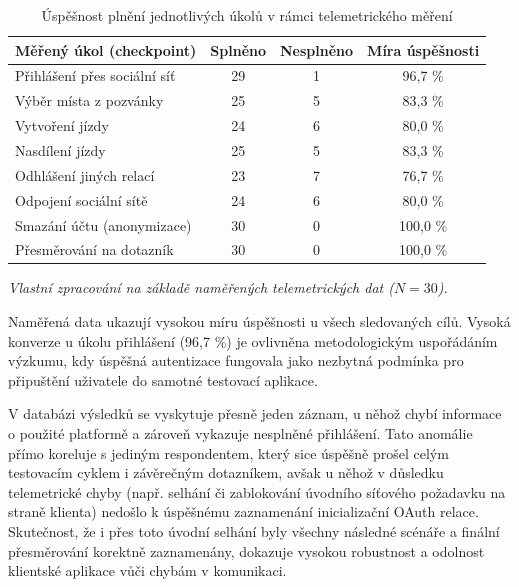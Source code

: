 \documentclass[male,czech,api_bc]{kitheses}
\renewcommand{\arraystretch}{1.23}
\newcommand{\zdroj}[1]{%
    \vspace{1ex}%
    {\footnotesize \raggedright \textit{#1}\par}%
}
\begin{document}
\begin{table}[htbp]
    \centering
    \small
    \renewcommand{\arraystretch}{1.23}
    \begin{tabularx}{\textwidth}{@{} >{\raggedright\arraybackslash}X c c c @{}}
        \toprule
        \textbf{Měřený úkol (checkpoint)} & \textbf{Splněno} & \textbf{Nesplněno} & \textbf{Míra úspěšnosti} \\
        \midrule
        Přihlášení přes sociální síť & 29 & 1 & 96,7 \% \\
        Výběr místa z pozvánky & 25 & 5 & 83,3 \% \\
        Vytvoření jízdy & 24 & 6 & 80,0 \% \\
        Nasdílení jízdy & 25 & 5 & 83,3 \% \\
        Odhlášení jiných relací & 23 & 7 & 76,7 \% \\
        Odpojení sociální sítě & 24 & 6 & 80,0 \% \\
        Smazání účtu (anonymizace) & 30 & 0 & 100,0 \% \\
        Přesměrování na dotazník & 30 & 0 & 100,0 \% \\
        \bottomrule
    \end{tabularx}
    \caption{Úspěšnost plnění jednotlivých úkolů v rámci telemetrického měření}
    \label{tab:telemetricke_checkpointy}
    \zdroj{Vlastní zpracování na základě naměřených telemetrických dat ($N=30$).}
\end{table}


Naměřená data ukazují vysokou míru úspěšnosti u všech sledovaných cílů. Vysoká konverze u úkolu přihlášení (96,7 \%) je ovlivněna metodologickým uspořádáním výzkumu, kdy úspěšná autentizace fungovala jako nezbytná podmínka pro připuštění uživatele do samotné testovací aplikace. 

V databázi výsledků se vyskytuje přesně jeden záznam, u něhož chybí informace o použité platformě a zároveň vykazuje nesplněné přihlášení. Tato anomálie přímo koreluje s jediným respondentem, který sice úspěšně prošel celým testovacím cyklem i závěrečným dotazníkem, avšak u něhož v důsledku telemetrické chyby (např. selhání či zablokování úvodního síťového požadavku na straně klienta) nedošlo k úspěšnému zaznamenání inicializační OAuth relace. Skutečnost, že i přes toto úvodní selhání byly všechny následné scénáře a finální přesměrování korektně zaznamenány, dokazuje vysokou robustnost a odolnost klientské aplikace vůči chybám v komunikaci.
\end{document}
